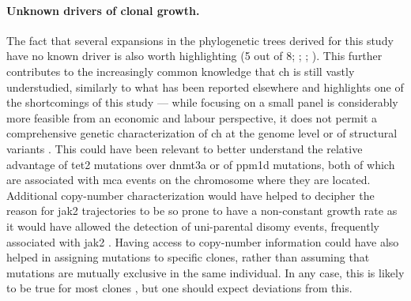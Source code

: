 \begin{figure}[!ht]
	\label{fig:prevalence-srsf2-p95h-u2af1}
\end{figure}

\paragraph{Unknown drivers of clonal growth.} The fact that several expansions in the phylogenetic trees derived for this study have no known driver is also worth highlighting (5 out of 8; ; ; ). This further contributes to the increasingly common knowledge that \ac{ch} is still vastly understudied, similarly to what has been reported elsewhere \cite{Poon2020-ek,Zink2017-zi} and highlights one of the shortcomings of this study --- while focusing on a small panel is considerably more feasible from an economic and labour perspective, it does not permit a comprehensive genetic characterization of \ac{ch} at the genome level or of structural variants \cite{Gao2021-ph,Terao2020-dd,Loh2020-vz,Loh2018-xp}. This could have been relevant to better understand the relative advantage of \ac{tet2} mutations over \ac{dnmt3a} or of \ac{ppm1d} mutations, both of which are associated with \ac{mca} events on the chromosome where they are located. Additional copy-number characterization would have helped to decipher the reason for \ac{jak2} trajectories to be so prone to have a non-constant growth rate as it would have allowed the detection of uni-parental disomy events, frequently associated with \ac{jak2} \cite{Wang2014-qz}. Having access to copy-number information could have also helped in assigning mutations to specific clones, rather than assuming that mutations are mutually exclusive in the same individual. In any case, this is likely to be true for most clones \cite{Miles2020-fz}, but one should expect deviations from this. 

